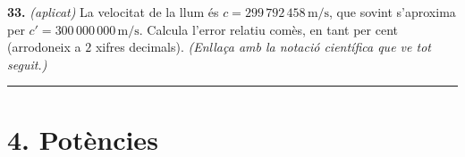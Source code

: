 \documentclass[13pt,a4paper]{extarticle}
\begin{document}
\par\noindent\begin{minipage}{\linewidth}
\textbf{33.} \emph{(aplicat)} La velocitat de la llum és $c=299\,792\,458\,\text{m/s}$, que sovint s'aproxima per $c'=300\,000\,000\,\text{m/s}$. Calcula l'error relatiu comès, en tant per cent (arrodoneix a $2$ xifres decimals). \emph{(Enllaça amb la notació científica que ve tot seguit.)}\par
\end{minipage}\par\vspace{1.6mm}
\vspace{1mm}\hrule\vspace{3mm}

\section*{4. Potències}
\end{document}
